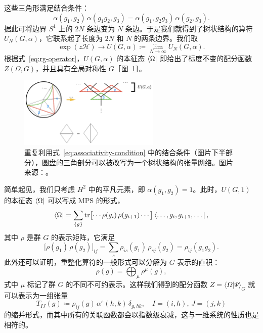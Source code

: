 这些三角形满足结合条件：
\begin{equation}
  \alpha(g_1, g_2) \, \alpha(g_1 g_2, g_3) = \alpha(g_1, g_2 g_3) \, \alpha(g_2, g_3).
  \label{eq:associativity-condition}
\end{equation}
据此可将边界 $S^1$ 上的 $2N$ 条边变为 $N$ 条边。于是我们就得到了树状结构的算符 $U_N(G,\alpha)$，它联系起了长度为 $2N$ 和 $N$ 的两条边界。我们取
\begin{equation}
  \exp(z\mathcal{H}) \to U(G,\alpha) \coloneq \lim_{N\to\infty} U_N(G,\alpha).
\end{equation}
根据式~\eqref{eq:rg-operator}，$U(G,\alpha)$ 的本征态 $\bra{\Omega}$ 即给出了标度不变的配分函数 $Z(\Omega,G)$，并且具有全局对称性 $G$［图~\ref{fig:rg-1+1d}］。

\begin{figure}[htb]
  \centering
  \includegraphics[width=0.6\textwidth]{images/holographic/rg-1+1d.png}
  \caption[结合条件与树状结构的张量网络]{重复利用式~\eqref{eq:associativity-condition} 中的结合条件（图片下半部分），圆盘的三角剖分可以被改写为一个树状结构的张量网络。图片来源：\parencite{chen2022exact}。}
  \label{fig:rg-1+1d}
\end{figure}

简单起见，我们只考虑 $H^2$ 中的平凡元素，即 $\alpha(g_1, g_2)=1$。此时，$U(G,1)$ 的本征态 $\bra{\Omega}$ 可以写成 MPS 的形式，
\begin{equation}
    \bra{\Omega}
  = \sum_{\{g\}} \tr\bigl[ \cdots \rho(g_i) \, \rho(g_{i+1}) \cdots \bigr]
    \bra{\dots, g_i, g_{i+1}, \dots},
\end{equation}
其中 $\rho$ 是群 $G$ 的表示矩阵，它满足
\begin{equation}
  \bigl[ \rho(g_1) \, \rho(g_2) \bigr]_{ij} = \sum_s \rho_{is}(g_1) \, \rho_{sj}(g_2) = \rho_{ij}(g_1 g_2).
\end{equation}
此外还可以证明，重整化算符的一般形式可以分解为 $G$ 表示的直积：
\begin{equation}
  \rho(g) = \bigoplus_\mu \rho^\mu(g),
\end{equation}
式中 $\mu$ 标记了群 $G$ 的不同不可约表示。这样我们得到的配分函数 $Z=\langle\Omega|\Psi\rangle_G$ 就可以表示为一组张量
\begin{equation}
  T_{IJ}(g) \coloneq \rho_{ij}(g) \, \alpha^\varepsilon(h,k) \, \delta_{g, hk}, \quad
  I = (i,h), \, J = (j,k)
\end{equation}
的缩并形式，而其中所有的关联函数都会以指数级衰减，这与一维系统的性质也是相符的。

